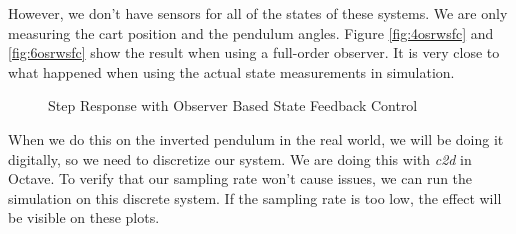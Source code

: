 \documentclass{article}
\begin{document}
However, we don't have sensors for all of the states of these systems. We are only measuring the cart position and the pendulum angles. Figure \ref{fig:4osrwsfc} and \ref{fig:6osrwsfc} show the result when using a full-order observer. It is very close to what happened when using the actual state measurements in simulation.

\begin{figure}
\centering
{}
\caption{Step Response with Observer Based State Feedback Control}
\end{figure}

When we do this on the inverted pendulum in the real world, we will be doing it digitally, so we need to discretize our system. We are doing this with \textit{c2d} in Octave. To verify that our sampling rate won't cause issues, we can run the simulation on this discrete system. If the sampling rate is too low, the effect will be visible on these plots.
\end{document}
